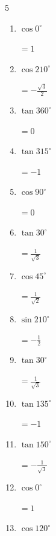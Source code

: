 \begin{multicols}{5}
\begin{enumerate}
        $\displaystyle =\sqrt{3}$

  \item $\displaystyle \cos{0^\circ}$

        $\displaystyle =1$

  \item $\displaystyle \cos{210^\circ}$

        $\displaystyle =-\frac{\sqrt{3}}{2}$

  \item $\displaystyle \tan{360^\circ}$

        $\displaystyle =0$

  \item $\displaystyle \tan{315^\circ}$

        $\displaystyle =-1$

  \item $\displaystyle \cos{90^\circ}$

        $\displaystyle =0$

  \item $\displaystyle \tan{30^\circ}$

        $\displaystyle =\frac{1}{\sqrt{3}}$

\columnbreak %

  \item $\displaystyle \cos{45^\circ}$

        $\displaystyle =\frac{1}{\sqrt{2}}$

  \item $\displaystyle \sin{210^\circ}$

        $\displaystyle =-\frac{1}{2}$

  \item $\displaystyle \tan{30^\circ}$

        $\displaystyle =\frac{1}{\sqrt{3}}$

  \item $\displaystyle \tan{135^\circ}$

        $\displaystyle =-1$

  \item $\displaystyle \tan{150^\circ}$

        $\displaystyle =-\frac{1}{\sqrt{3}}$

  \item $\displaystyle \cos{0^\circ}$

        $\displaystyle =1$

  \item $\displaystyle \cos{120^\circ}$


\end{enumerate}
\end{multicols}
